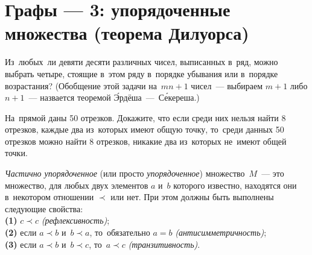 
\section*{Графы --- 3: упорядоченные множества (теорема Дилуорса)}


\begin{problems}

\item
Из~любых~ли
\quad
\sp девяти
\quad
\sp десяти
\quad
различных чисел, выписанных в~ряд, можно выбрать четыре, стоящие в~этом ряду
в~порядке убывания или в~порядке возрастания?
(Обобщение этой задачи на~$m n + 1$ чисел~---
выбираем $m + 1$ либо $n + 1$~--- назвается
теоремой \'{Э}рдёша~---~С\'{е}кереша.)

\item
На~прямой даны 50 отрезков.
Докажите, что если среди них нельзя найти 8 отрезков, каждые два из~которых
имеют общую точку, то~среди данных 50 отрезков можно найти 8 отрезков, никакие
два из~которых не~имеют общей точки.

\end{problems}

\emph{Частично упорядоченное} (или просто \emph{упорядоченное})
множество~$M$~--- это множество, для любых двух элементов $a$ и~$b$ которого
известно, находятся они в~некотором отношении $\prec$ или нет.
При этом должны быть выполнены следующие свойства:
\\
\textbf{(1)}
$c \prec c$ \emph{(рефлексивность)};
\\
\textbf{(2)}
если $a \prec b$ и~$b \prec a$, то~обязательно $a = b$
\emph{(антисимметричность)};
\\
\textbf{(3)}
если $a \prec b$ и~$b \prec c$, то~$a \prec c$ \emph{(транзитивность)}.

